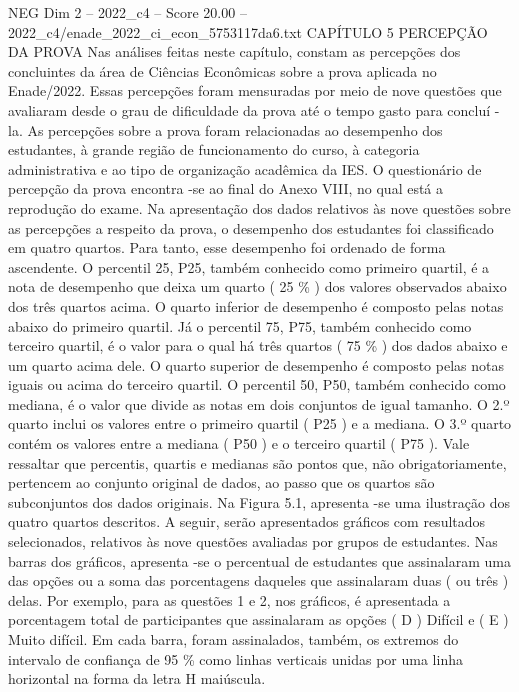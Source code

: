 \begin{textsample}{NEG Dim 2 – 2022\_c4 – Score 20.00 – 2022\_c4/enade\_2022\_ci\_econ\_5753117da6.txt}  \label{ex:f2_neg_413}
CAPÍTULO 5 PERCEPÇÃO DA PROVA Nas análises feitas neste capítulo, constam as percepções dos concluintes da área de Ciências Econômicas sobre a prova aplicada no Enade/2022.
Essas percepções foram mensuradas por meio de nove questões que avaliaram desde o grau de dificuldade da prova até o tempo gasto para concluí -la.
As percepções sobre a prova foram relacionadas ao desempenho dos estudantes, à grande região de funcionamento do curso, à categoria administrativa e ao tipo de organização acadêmica da IES.
O questionário de percepção da prova encontra -se ao final do Anexo VIII, no qual está a reprodução do exame.
Na apresentação dos dados relativos às nove questões sobre as percepções a respeito da prova, o desempenho dos estudantes foi classificado em quatro quartos.
Para tanto, esse desempenho foi ordenado de forma ascendente.
O percentil 25, P25, também conhecido como primeiro quartil, é a nota de desempenho que deixa um quarto ( 25 \% ) dos valores observados abaixo dos três quartos acima.
O quarto inferior de desempenho é composto pelas notas abaixo do primeiro quartil.
Já o percentil 75, P75, também conhecido como terceiro quartil, é o valor para o qual há três quartos ( 75 \% ) dos dados abaixo e um quarto acima dele.
O quarto superior de desempenho é composto pelas notas iguais ou acima do terceiro quartil.
O percentil 50, P50, também conhecido como mediana, é o valor que divide as notas em dois conjuntos de igual tamanho.
O 2.º quarto inclui os valores entre o primeiro quartil ( P25 ) e a mediana.
O 3.º quarto contém os valores entre a mediana ( P50 ) e o terceiro quartil ( P75 ).
Vale ressaltar que percentis, quartis e medianas são pontos que, não obrigatoriamente, pertencem ao conjunto original de dados, ao passo que os quartos são subconjuntos dos dados originais.
Na Figura 5.1, apresenta -se uma ilustração dos quatro quartos descritos.
A seguir, serão apresentados gráficos com resultados selecionados, relativos às nove questões avaliadas por grupos de estudantes.
Nas barras dos gráficos, apresenta -se o percentual de estudantes que assinalaram uma das opções ou a soma das porcentagens daqueles que assinalaram duas ( ou três ) delas.
Por exemplo, para as questões 1 e 2, nos gráficos, é apresentada a porcentagem total de participantes que assinalaram as opções ( D ) Difícil e ( E ) Muito difícil.
Em cada barra, foram assinalados, também, os extremos do intervalo de confiança de 95 \% como linhas verticais unidas por uma linha horizontal na forma da letra H maiúscula.

\end{textsample}
